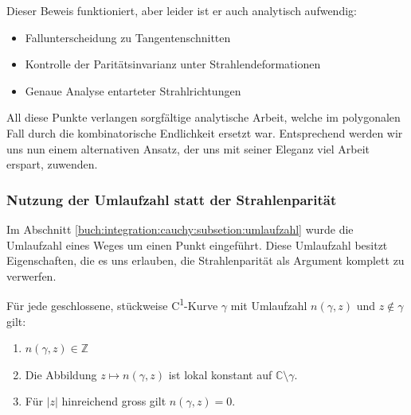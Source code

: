 Dieser Beweis funktioniert, aber leider ist er auch analytisch aufwendig:

\begin{itemize}
    \item Fallunterscheidung zu Tangentenschnitten
    \item Kontrolle der Paritätsinvarianz unter Strahlendeformationen
    \item Genaue Analyse entarteter Strahlrichtungen
\end{itemize}

All diese Punkte verlangen sorgfältige analytische Arbeit, welche im polygonalen Fall durch die kombinatorische Endlichkeit ersetzt war. 
Entsprechend werden wir uns nun einem alternativen Ansatz, der uns mit seiner Eleganz viel Arbeit erspart, zuwenden. 

\subsubsection{Nutzung der Umlaufzahl statt der Strahlenparität}

Im Abschnitt \ref{buch:integration:cauchy:subsetion:umlaufzahl} wurde die Umlaufzahl eines Weges um einen Punkt eingeführt. 
Diese Umlaufzahl besitzt Eigenschaften, die es uns erlauben, die Strahlenparität als Argument komplett zu verwerfen. 

\begin{lemma}
    Für jede geschlossene, stückweise C\textsuperscript{1}-Kurve $\gamma$ mit Umlaufzahl $n(\gamma, z)$ und $z \notin \gamma$ gilt:
    \begin{enumerate}
        \item $n(\gamma, z) \in \mathbb{Z}$
        \item Die Abbildung $z \mapsto n(\gamma, z)$ ist lokal konstant auf $\mathbb{C} \setminus \gamma$.
        \item Für $|z|$ hinreichend gross gilt $n(\gamma, z) = 0$.
    \end{enumerate}

\end{lemma}

